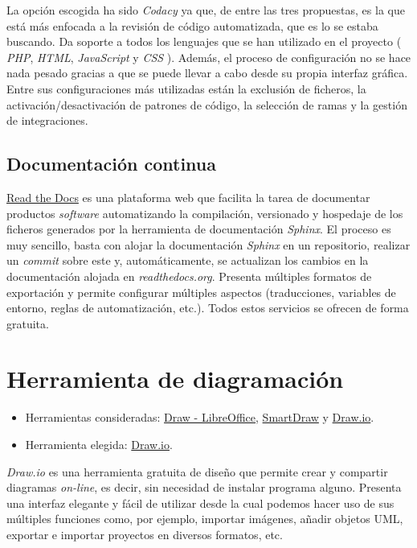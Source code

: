 La opción escogida ha sido \emph{Codacy} ya que, de entre las tres
propuestas, es la que está más enfocada a la revisión de código
automatizada, que es lo se estaba buscando. Da soporte a todos los
lenguajes que se han utilizado en el proyecto ( \emph{PHP}, \emph{HTML},
\emph{JavaScript} y \emph{CSS} ). Además, el proceso de configuración no
se hace nada pesado gracias a que se puede llevar a cabo desde su propia
interfaz gráfica. Entre sus configuraciones más utilizadas están la
exclusión de ficheros, la activación/desactivación de patrones de
código, la selección de ramas y la gestión de integraciones.

\subsection{Documentación continua}

\href{https://readthedocs.org/}{Read the Docs} es una plataforma web que
facilita la tarea de documentar productos \emph{software} automatizando
la compilación, versionado y hospedaje de los ficheros generados por la
herramienta de documentación \emph{Sphinx}. El proceso es muy sencillo,
basta con alojar la documentación \emph{Sphinx} en un repositorio,
realizar un \emph{commit} sobre este y, automáticamente, se actualizan
los cambios en la documentación alojada en \emph{readthedocs.org}.
Presenta múltiples formatos de exportación y permite configurar
múltiples aspectos (traducciones, variables de entorno, reglas de
automatización, etc.). Todos estos servicios se ofrecen de forma
gratuita.

\section{Herramienta de diagramación}

\begin{itemize}
\tightlist
\item
  Herramientas consideradas:
  \href{https://es.libreoffice.org/descubre/draw/}{Draw - LibreOffice},
  \href{https://www.smartdraw.com/}{SmartDraw} y
  \href{https://app.diagrams.net/}{Draw.io}.
\item
  Herramienta elegida: \href{https://app.diagrams.net/}{Draw.io}.
\end{itemize}

\emph{Draw.io} es una herramienta gratuita de diseño que permite crear y
compartir diagramas \emph{on-line}, es decir, sin necesidad de instalar
programa alguno. Presenta una interfaz elegante y fácil de utilizar
desde la cual podemos hacer uso de sus múltiples funciones como, por
ejemplo, importar imágenes, añadir objetos UML, exportar e importar
proyectos en diversos formatos, etc.

